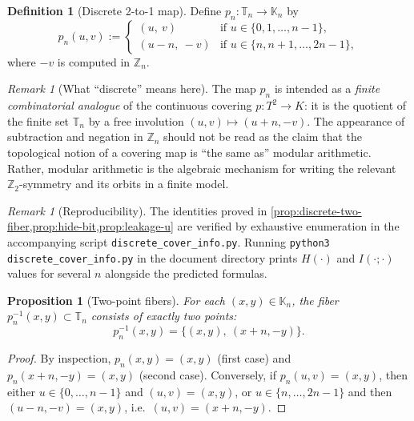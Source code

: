 \documentclass[11pt,a4paper]{article}
\newtheorem{proposition}[theorem]{Proposition}
\theoremstyle{definition}
\newtheorem{definition}[theorem]{Definition}
\theoremstyle{remark}
\newtheorem{remark}[theorem]{Remark}
\begin{document}
\begin{definition}[Discrete 2-to-1 map]
\label{def:discrete-cover}
Define \(p_n:\mathbb{T}_n\to \mathbb{K}_n\) by
\[
p_n(u,v) :=
\begin{cases}
(u,\ v) & \text{if } u\in\{0,1,\dots,n-1\},\\
(u-n,\ -v) & \text{if } u\in\{n,n+1,\dots,2n-1\},
\end{cases}
\]
where \(-v\) is computed in \(\mathbb{Z}_n\).
\end{definition}

\begin{remark}[What ``discrete'' means here]
\label{rem:discrete-not-equal-covering}
The map \(p_n\) is intended as a \emph{finite combinatorial analogue} of the continuous covering \(p:T^2\to K\): it is the quotient of the finite set \(\mathbb{T}_n\) by a free involution \((u,v)\mapsto(u+n,-v)\). The appearance of subtraction and negation in \(\mathbb{Z}_n\) should not be read as the claim that the topological notion of a covering map is ``the same as'' modular arithmetic. Rather, modular arithmetic is the algebraic mechanism for writing the relevant \(\mathbb{Z}_2\)-symmetry and its orbits in a finite model.
\end{remark}

\begin{remark}[Reproducibility]
\label{rem:reproducibility}
The identities proved in \cref{prop:discrete-two-fiber,prop:hide-bit,prop:leakage-u} are verified by exhaustive enumeration in the accompanying script \texttt{discrete\_cover\_info.py}. Running \texttt{python3 discrete\_cover\_info.py} in the document directory prints \(H(\cdot)\) and \(I(\cdot;\cdot)\) values for several \(n\) alongside the predicted formulas.
\end{remark}

\begin{proposition}[Two-point fibers]
\label{prop:discrete-two-fiber}
For each \((x,y)\in\mathbb{K}_n\), the fiber \(p_n^{-1}(x,y)\subset \mathbb{T}_n\) consists of exactly two points:
\[
p_n^{-1}(x,y)=\{(x,y),\ (x+n,-y)\}.
\]
\end{proposition}

\begin{proof}
By inspection, \(p_n(x,y)=(x,y)\) (first case) and \(p_n(x+n,-y)=(x,y)\) (second case). Conversely, if \(p_n(u,v)=(x,y)\), then either \(u\in\{0,\dots,n-1\}\) and \((u,v)=(x,y)\), or \(u\in\{n,\dots,2n-1\}\) and then \((u-n,-v)=(x,y)\), i.e.\ \((u,v)=(x+n,-y)\).
\end{proof}
\end{document}
